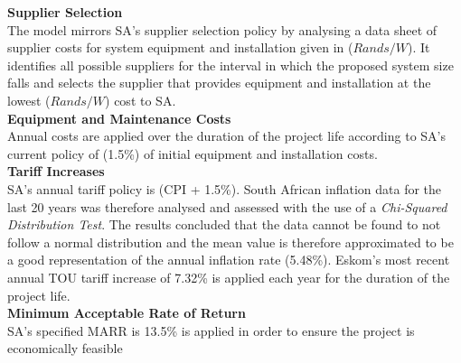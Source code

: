 \documentclass[a4paper,11pt,fleqn]{report}
\begin{document}
\noindent\textbf{Supplier Selection}\\
The model mirrors \ac{SA}'s supplier selection policy by analysing a data sheet of supplier costs for system equipment and installation given in ($Rands/W$). It identifies all possible suppliers for the interval in which the proposed system size falls and selects the supplier that provides equipment and installation at the lowest ($Rands/W$) cost to \ac{SA}.\\

\noindent\textbf{Equipment and Maintenance Costs}\\
Annual  costs are applied over the duration of the project life according to \ac{SA}'s current policy of (1.5\%) of initial equipment and installation costs.\\ 

\noindent\textbf{Tariff Increases}\\
\ac{SA}'s annual tariff policy is (\ac{CPI} + 1.5\%). South African inflation data for the last 20 years was therefore analysed and assessed with the use of a \textit{Chi-Squared Distribution Test}. The results concluded that the data cannot be found to not follow a normal distribution and the mean value is therefore approximated to be a good representation of the annual inflation rate (5.48\%). Eskom's most recent annual \ac{TOU} tariff increase of 7.32\% is applied each year for the duration of the project life.\\

\noindent\textbf{Minimum Acceptable Rate of Return}\\
\ac{SA}'s specified \ac{MARR} is 13.5\% is applied in order to ensure the project  is economically feasible

\end{document}
